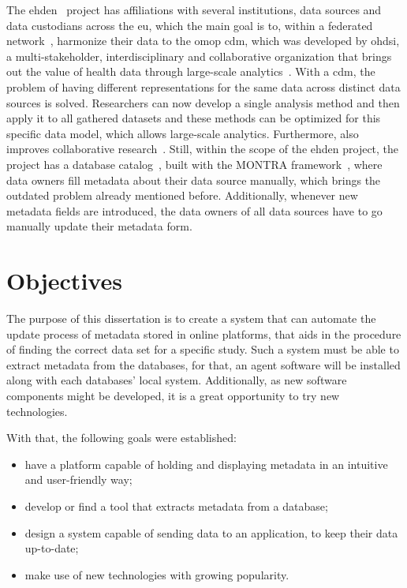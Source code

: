 The \gls{ehden}~\cite{ehden} project has affiliations with several institutions, data sources and data custodians across the \gls{eu}, which the main goal is to, within a federated network~\cite{ehden-datapartners}, harmonize their data to the \gls{omop} \gls{cdm}, which was developed by \gls{ohdsi}, a multi-stakeholder, interdisciplinary and collaborative organization that brings out the value of health data through large-scale analytics~\cite{ohdsi-site}.
With a \gls{cdm}, the problem of having different representations for the same data
across distinct data sources is solved.
Researchers can now develop a single analysis method and then apply it to all gathered
datasets and these methods can be optimized for this specific data model, which allows
large-scale analytics.
Furthermore, also improves collaborative research~\cite{ohdsi-site}.
Still, within the scope of the \gls{ehden} project, the project has a database catalog~\cite{ehden-portal},
built with the MONTRA framework~\cite{montra}, where data owners fill metadata about
their data source manually, which brings the outdated problem already mentioned before.
Additionally, whenever new metadata fields are introduced, the data owners of all data
sources have to go manually update their metadata form.

\section{Objectives}
The purpose of this dissertation is to create a system that can automate the update process of metadata stored in online platforms, that aids in the procedure of finding the correct data set for a specific study.
Such a system must be able to extract metadata from the databases, for that, an agent software will be installed along with each databases' local system.
Additionally, as new software components might be developed, it is a great opportunity to try new technologies.

With that, the following goals were established:
\begin{itemize}
    \item have a platform capable of holding and displaying metadata in an intuitive and user-friendly way;
    \item develop or find a tool that extracts metadata from a database;
    \item design a system capable of sending data to an application, to keep their data up-to-date;
    \item make use of new technologies with growing popularity.
\end{itemize}

